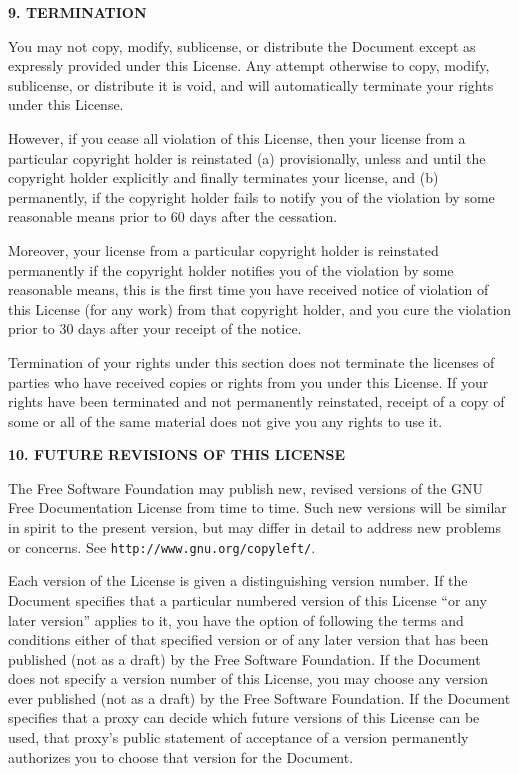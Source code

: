 \documentclass[11pt]{book}
\numberwithin{example}{chapter}
\begin{document}
\begin{center}
{\Large\bf 9. TERMINATION\par}

\end{center}


You may not copy, modify, sublicense, or distribute the Document
except as expressly provided under this License.  Any attempt
otherwise to copy, modify, sublicense, or distribute it is void, and
will automatically terminate your rights under this License.

However, if you cease all violation of this License, then your license
from a particular copyright holder is reinstated (a) provisionally,
unless and until the copyright holder explicitly and finally
terminates your license, and (b) permanently, if the copyright holder
fails to notify you of the violation by some reasonable means prior to
60 days after the cessation.

Moreover, your license from a particular copyright holder is
reinstated permanently if the copyright holder notifies you of the
violation by some reasonable means, this is the first time you have
received notice of violation of this License (for any work) from that
copyright holder, and you cure the violation prior to 30 days after
your receipt of the notice.

Termination of your rights under this section does not terminate the
licenses of parties who have received copies or rights from you under
this License.  If your rights have been terminated and not permanently
reinstated, receipt of a copy of some or all of the same material does
not give you any rights to use it.


\begin{center}
{\Large\bf 10. FUTURE REVISIONS OF THIS LICENSE\par}

\end{center}


The Free Software Foundation may publish new, revised versions
of the GNU Free Documentation License from time to time.  Such new
versions will be similar in spirit to the present version, but may
differ in detail to address new problems or concerns.  See
\texttt{http://www.gnu.org/copyleft/}.

Each version of the License is given a distinguishing version number.
If the Document specifies that a particular numbered version of this
License ``or any later version'' applies to it, you have the option of
following the terms and conditions either of that specified version or
of any later version that has been published (not as a draft) by the
Free Software Foundation.  If the Document does not specify a version
number of this License, you may choose any version ever published (not
as a draft) by the Free Software Foundation.  If the Document
specifies that a proxy can decide which future versions of this
License can be used, that proxy's public statement of acceptance of a
version permanently authorizes you to choose that version for the
Document.
\end{document}
